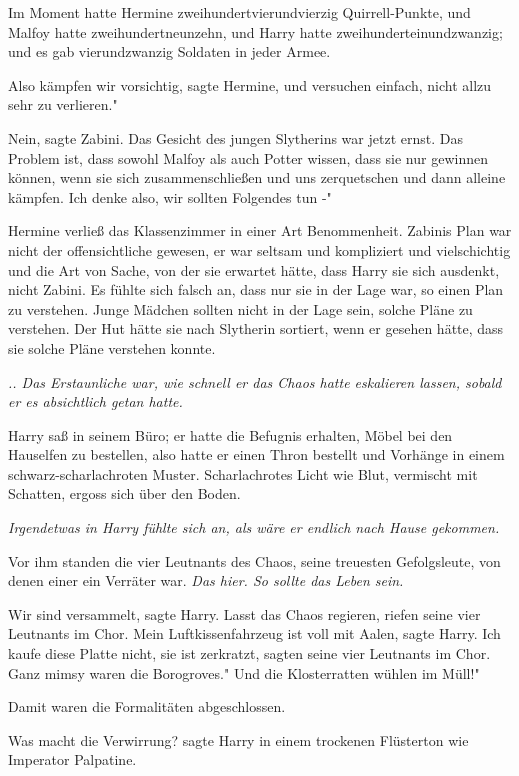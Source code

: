 Im Moment hatte Hermine zweihundertvierundvierzig Quirrell-Punkte, und Malfoy
hatte zweihundertneunzehn, und Harry hatte zweihunderteinundzwanzig; und es gab
vierundzwanzig Soldaten in jeder Armee.

\glqq Also kämpfen wir vorsichtig\grqq{}, sagte Hermine, \glqq und versuchen
einfach, nicht allzu sehr zu verlieren."

\glqq Nein\grqq{}, sagte Zabini. Das Gesicht des jungen Slytherins war jetzt
ernst. \glqq Das Problem ist, dass sowohl Malfoy als auch Potter wissen, dass
sie nur gewinnen können, wenn sie sich zusammenschließen und uns zerquetschen
und dann alleine kämpfen. Ich denke also, wir sollten Folgendes tun -"

Hermine verließ das Klassenzimmer in einer Art Benommenheit. Zabinis Plan war
nicht der offensichtliche gewesen, er war seltsam und kompliziert und
vielschichtig und die Art von Sache, von der sie erwartet hätte, dass Harry sie
sich ausdenkt, nicht Zabini. Es fühlte sich falsch an, dass nur sie in der Lage
war, so einen Plan zu verstehen. Junge Mädchen sollten nicht in der Lage sein,
solche Pläne zu verstehen. Der Hut hätte sie nach Slytherin sortiert, wenn er
gesehen hätte, dass sie solche Pläne verstehen konnte.

\emph{.. Das Erstaunliche war, wie schnell er das Chaos hatte eskalieren lassen,
sobald er es absichtlich getan hatte.}

Harry saß in seinem Büro; er hatte die Befugnis erhalten, Möbel bei den
Hauselfen zu bestellen, also hatte er einen Thron bestellt und Vorhänge in einem
schwarz-scharlachroten Muster. Scharlachrotes Licht wie Blut, vermischt mit
Schatten, ergoss sich über den Boden.

\emph{Irgendetwas in Harry fühlte sich an, als wäre er endlich nach Hause gekommen.}

Vor ihm standen die vier Leutnants des Chaos, seine treuesten Gefolgsleute, von
denen einer ein Verräter war.\emph{ Das hier. So sollte das Leben sein.}

\glqq Wir sind versammelt\grqq{}, sagte Harry. \glqq Lasst das Chaos
regieren\grqq{}, riefen seine vier Leutnants im Chor. \glqq Mein
Luftkissenfahrzeug ist voll mit Aalen\grqq{}, sagte Harry. \glqq Ich kaufe diese
Platte nicht, sie ist zerkratzt\grqq{}, sagten seine vier Leutnants im Chor.
\glqq Ganz mimsy waren die Borogroves." \glqq Und die Klosterratten wühlen im
Müll!"

Damit waren die Formalitäten abgeschlossen.

\glqq Was macht die Verwirrung?\grqq{} sagte Harry in einem trockenen Flüsterton
wie Imperator Palpatine.

